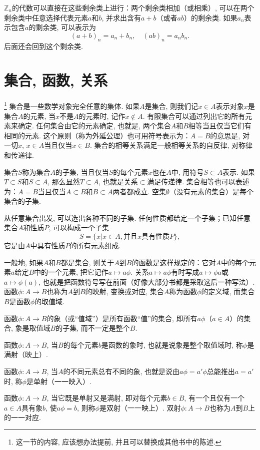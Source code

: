 $\mathbb{Z}_n$的代数可以直接在这些剩余类上进行：两个剩余类相加（或相乘）, 可以在两个剩余类中任意选择代表元素$a$和$b$, 并求出含有$a+b$（或者$ab$）的剩余类. 如果$a_n$表示包含$a$的剩余类, 可以表示为
\[
(a+b)_n = a_n + b_n, \quad (ab)_n = a_nb_n.
\]
后面还会回到这个剩余类. 


\section{集合, 函数, 关系}\label{section0010111}\footnote{这一节的内容, 应该想办法提前, 并且可以替换成其他书中的陈述. }
集合是一些数学对象完全任意的集体. 如果$A$是集合, 则我们记$x \in A$表示对象$x$是集合$A$的元素, 当$x$不是$A$的元素时, 记作$x \not\in A$. 有限集合可以通过列出它的所有元素来确定. 任何集合由它的元素确定, 也就是, 两个集合$A$和$B$相等当且仅当它们有相同的元素. 这个原则（称为外延公理）也可用符号表示为：$A=B$的意思是, 对一切$x$, $x \in A$当且仅当$x \in B$. 集合的相等关系满足一般相等关系的自反律, 对称律和传递律. 

集合$S$称为集合$A$的子集, 当且仅当$S$的每个元素$x$也在$A$中, 用符号$S \subset A$表示. 如果$T \subset S$和$S \subset A$, 那么显然$T \subset A$, 也就是关系$\subset$满足传递律. 集合相等也可以表述为：$A=B$当且仅当$A \subset B$和$B \subset A$两者都成立. 空集$\emptyset$（没有元素的集合）是每个集合的子集. 

从任意集合出发, 可以选出各种不同的子集. 任何性质都给定一个子集；已知任意集合$A$和性质$P$, 可以构成一个子集
\[
S = \{x | x \in A, \text{并且}x\text{具有性质}P\},
\]
它是由$A$中具有性质$P$的所有元素组成. 

一般地, 如果$A$和$B$都是集合, 则关于$A$到$B$的函数是这样规定的：它对$A$中的每个元素$a$给定$B$中的一个元素, 把它记作$a \mapsto a\phi$. 关系$a \mapsto a\phi$有时写成$a \mapsto \phi{}a$或$a \mapsto \phi(a)$, 也就是把函数符号写在前面（好像大部分书都是采取这后一种写法）. 函数$\phi: A \to B$也称为$A$到$B$的映射, 变换或对应, 集合$A$称为函数$\phi$的定义域, 而集合$B$是函数$\phi$的取值域. 

函数$\phi: A \to B$的象（或“值域”）是所有函数“值”的集合, 即所有$a\phi$（$a \in A$）的集合, 象是取值域$B$的子集, 而不一定是整个$B$. 

函数$\phi:A \to B$, 当$B$的每个元素$b$是函数的象时, 也就是说象是整个取值域时, 称$\phi$是满射（映上）. 

函数$\phi:A \to B$, 当$A$的不同元素总有不同的象, 也就是说由$a\phi=a'\phi$总能推出$a=a'$时, 称$\phi$是单射（一一映入）. 

函数$\phi:A \to B$, 当它既是单射又是满射, 即对每个元素$b \in B$, 有一个且仅有一个$a \in A$具有象$b$, 使$a\phi = b$, 则称$\phi$是双射（一一映上）. 双射$\phi:A \to B$也称为$A$到$B$上的一一对应. 

